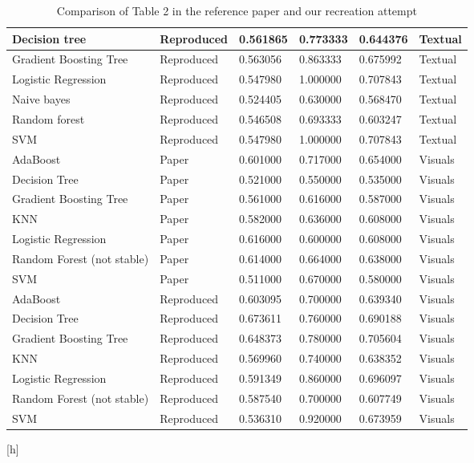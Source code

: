 \begin{table*}[h]
\begin{tabular}{|l|l|l|l|l|l|}
Decision tree & Reproduced & 0.561865 & 0.773333 & 0.644376 & Textual \\ \hline
Gradient Boosting Tree & Reproduced & 0.563056 & 0.863333 & 0.675992 & Textual \\ \hline
Logistic Regression & Reproduced & 0.547980 & 1.000000 & 0.707843 & Textual \\ \hline
Naive bayes & Reproduced & 0.524405 & 0.630000 & 0.568470 & Textual \\ \hline
Random forest & Reproduced & 0.546508 & 0.693333 & 0.603247 & Textual \\ \hline
SVM & Reproduced & 0.547980 & 1.000000 & 0.707843 & Textual \\ \hline
AdaBoost & Paper & 0.601000 & 0.717000 & 0.654000 & Visuals \\ \hline
Decision Tree & Paper & 0.521000 & 0.550000 & 0.535000 & Visuals \\ \hline
Gradient Boosting Tree & Paper & 0.561000 & 0.616000 & 0.587000 & Visuals \\ \hline
KNN & Paper & 0.582000 & 0.636000 & 0.608000 & Visuals \\ \hline
Logistic Regression & Paper & 0.616000 & 0.600000 & 0.608000 & Visuals \\ \hline
Random Forest (not stable) & Paper & 0.614000 & 0.664000 & 0.638000 & Visuals \\ \hline
SVM & Paper & 0.511000 & 0.670000 & 0.580000 & Visuals \\ \hline
AdaBoost & Reproduced & 0.603095 & 0.700000 & 0.639340 & Visuals \\ \hline
Decision Tree & Reproduced & 0.673611 & 0.760000 & 0.690188 & Visuals \\ \hline
Gradient Boosting Tree & Reproduced & 0.648373 & 0.780000 & 0.705604 & Visuals \\ \hline
KNN & Reproduced & 0.569960 & 0.740000 & 0.638352 & Visuals \\ \hline
Logistic Regression & Reproduced & 0.591349 & 0.860000 & 0.696097 & Visuals \\ \hline
Random Forest (not stable) & Reproduced & 0.587540 & 0.700000 & 0.607749 & Visuals \\ \hline
SVM & Reproduced & 0.536310 & 0.920000 & 0.673959 & Visuals \\ \hline

\end{tabular}
\caption{Comparison of Table 2 in the reference paper and our recreation attempt}
\label{table2}
\end{table*}[h]